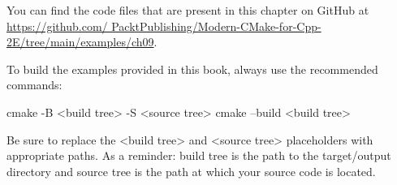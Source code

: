 You can find the code files that are present in this chapter on GitHub at \url{https://github.com/ PacktPublishing/Modern-CMake-for-Cpp-2E/tree/main/examples/ch09}.

To build the examples provided in this book, always use the recommended commands:

\begin{shell}
cmake -B <build tree> -S <source tree>
cmake --build <build tree>
\end{shell}

Be sure to replace the <build tree> and <source tree> placeholders with appropriate paths.
As a reminder: build tree is the path to the target/output directory and source tree is the path at which your source code is located.